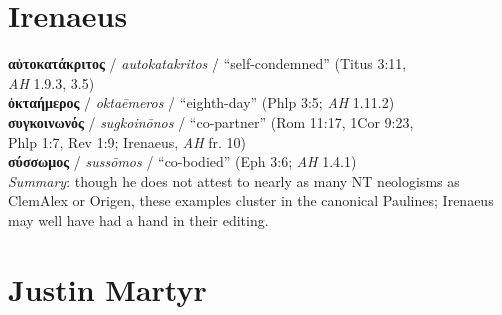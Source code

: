 \section{Irenaeus}

\noindent{}\textbf{αὐτοκατάκριτος} / \textit{autokatakritos} / “self-condemned” (Titus 3:11, %
\\\makebox[3em][l]{}\textit{AH} 1.9.3, 3.5) \\[0.4mm] %
\noindent{}\textbf{ὀκταήμερος} / \textit{oktaēmeros} / “eighth-day” (Phlp 3:5; \textit{AH} 1.11.2) \\[0.4mm] %
\noindent{}\textbf{συγκοινωνός} / \textit{sugkoinōnos} / “co-partner” (Rom 11:17, 1Cor 9:23, %
\\\makebox[3em][l]{}Phlp 1:7, Rev 1:9; Irenaeus, \textit{AH} fr. 10) \\[0.4mm] %
\noindent{}\textbf{σύσσωμος} / \textit{sussōmos} / “co-bodied” (Eph 3:6; \textit{AH} 1.4.1) \\[1mm] %

\noindent{}\textit{Summary}: though he does not attest to nearly as many NT neologisms as ClemAlex or Origen, %
these examples cluster in the canonical Paulines; %
Irenaeus may well have had a hand in their editing. \clearpage %

\section{Justin Martyr}

